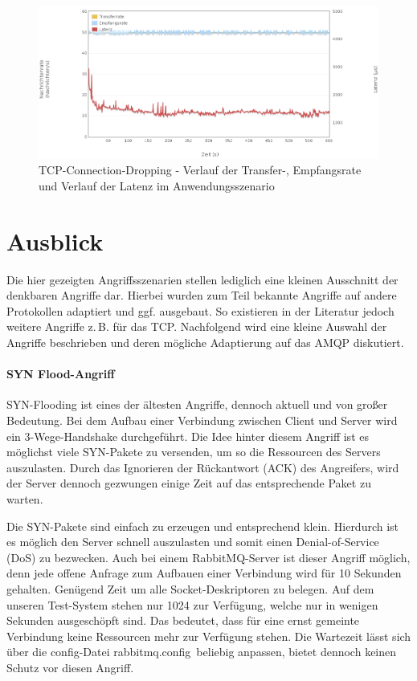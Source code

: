 \documentclass[	a4paper,
			11pt,
			oneside,
			parskip]{scrartcl}
\begin{document}
		\begin{figure}[!htb]
			\centering
			\includegraphics[width=\textwidth]{img/tcpdrop/tcpdrop_scenario.png}
			\caption{TCP-Connection-Dropping - Verlauf der Transfer-, Empfangsrate und Verlauf der Latenz im Anwendungsszenario}
			\label{fig:tcpdrop-scenario}
		\end{figure}
		
		
\clearpage
\section*{Ausblick}
	Die hier gezeigten Angriffsszenarien stellen lediglich eine kleinen Ausschnitt der denkbaren Angriffe dar. Hierbei wurden zum Teil bekannte Angriffe auf andere Protokollen adaptiert und ggf. ausgebaut.
	So existieren in der Literatur jedoch weitere Angriffe z.\,B. für das TCP. Nachfolgend wird eine kleine Auswahl der Angriffe beschrieben und deren mögliche Adaptierung auf das AMQP diskutiert. 

	\paragraph{SYN Flood-Angriff} 
		SYN-Flooding ist eines der ältesten Angriffe, dennoch aktuell und von großer Bedeutung. Bei dem Aufbau einer Verbindung zwischen Client und Server wird ein 3-Wege-Handshake durchgeführt. Die Idee hinter diesem Angriff ist es möglichst viele SYN-Pakete zu versenden, um so die Ressourcen des Servers auszulasten. Durch das Ignorieren der Rückantwort (ACK) des Angreifers, wird der Server dennoch gezwungen einige Zeit auf das entsprechende Paket zu warten.

		Die SYN-Pakete sind einfach zu erzeugen und entsprechend klein. Hierdurch ist es möglich den Server schnell auszulasten und somit einen Denial-of-Service (DoS) zu bezwecken. Auch bei einem RabbitMQ-Server ist dieser Angriff möglich, denn jede offene Anfrage zum Aufbauen einer Verbindung wird für 10 Sekunden gehalten. Genügend Zeit um alle Socket-Deskriptoren zu belegen. Auf dem unseren Test-System stehen nur 1024 zur Verfügung, welche nur in wenigen Sekunden ausgeschöpft sind. Das bedeutet, dass für eine ernst gemeinte Verbindung keine Ressourcen mehr zur Verfügung stehen. Die Wartezeit lässt sich über die config-Datei \glqq rabbitmq.config\grqq\ beliebig anpassen, bietet dennoch keinen Schutz vor diesen Angriff.
\end{document}
